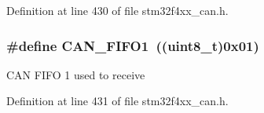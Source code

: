 Definition at line 430 of file stm32f4xx\-\_\-can.\-h.

\hypertarget{group___c_a_n__receive___f_i_f_o__number__constants_gafbcf3f13dbf61030ab7a812595ba9850}{
\subsubsection[{C\-A\-N\-\_\-\-F\-I\-F\-O1}]{\setlength{\rightskip}{0pt plus 5cm}\#define C\-A\-N\-\_\-\-F\-I\-F\-O1~((uint8\-\_\-t)0x01)}}\label{group___c_a_n__receive___f_i_f_o__number__constants_gafbcf3f13dbf61030ab7a812595ba9850}
C\-A\-N F\-I\-F\-O 1 used to receive 

Definition at line 431 of file stm32f4xx\-\_\-can.\-h.

